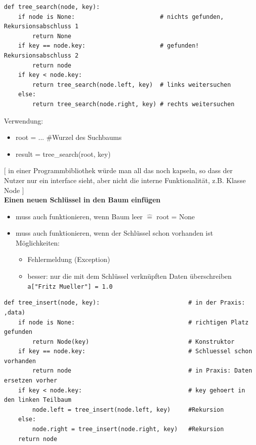 \documentclass[11pt, fleqn]{scrreprt}
\begin{document}
\begin{verbatim}
def tree_search(node, key):
    if node is None:                        # nichts gefunden, Rekursionsabschluss 1
        return None
    if key == node.key:                     # gefunden! Rekursionsabschluss 2
        return node
    if key < node.key:
        return tree_search(node.left, key)  # links weitersuchen
    else:
        return tree_search(node.right, key) # rechts weitersuchen
\end{verbatim}

Verwendung:
\begin{itemize}[label ={}]
    \item root = ...    \hspace*{1cm} \#Wurzel des Suchbaums
    \item result = tree\_search(root, key)
\end{itemize}
$[$ in einer Programmbibliothek würde man all das noch \glqq kapseln\grqq , so dass der Nutzer nur ein interface sieht, aber nicht die interne Funktionalität, z.B. Klasse Node $]$ \\

\textbf{Einen neuen Schlüssel in den Baum einfügen}
\begin{itemize}
    \item muss auch funktionieren, wenn Baum leer $\widehat{=}$ root = None
    \item muss auch funktionieren, wenn der Schlüssel schon vorhanden ist \\
    Möglichkeiten:
    \begin{itemize}
        \item Fehlermeldung (Exception)
        \item besser: nur die mit dem Schlüssel verknüpften Daten überschreiben \verb|a["Fritz Mueller"] = 1.0|
    \end{itemize}
\end{itemize}

\begin{verbatim}
def tree_insert(node, key):                         # in der Praxis: ,data)
    if node is None:                                # richtigen Platz gefunden
        return Node(key)                            # Konstruktor
    if key == node.key:                             # Schluessel schon vorhanden
        return node                                 # in Praxis: Daten ersetzen vorher
    if key < node.key:                              # key gehoert in den linken Teilbaum
        node.left = tree_insert(node.left, key)     #Rekursion
    else:
        node.right = tree_insert(node.right, key)   #Rekursion
    return node
\end{verbatim}
\end{document}
